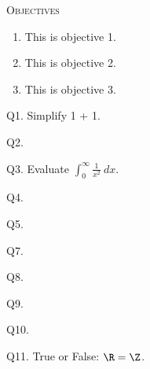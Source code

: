 


\renewcommand\COURSENAME{System Penetration and Hacking}
\renewcommand\COURSESHORTNAME{System Penetration \& Hacking}
\renewcommand\COURSENUMBER{CISS999}
\renewcommand\TITLE{Assignment 42}


\topmatter

\textsc{Objectives}
\begin{enumerate}[nosep]
\item This is objective 1.
\item This is objective 2.
\item This is objective 3.
\end{enumerate}




\newpage
Q1. Simplify 1 + 1.




\newpage
Q2. \lipsum[1-2]




\newpage
Q3. Evaluate $\int_0^\infty \frac{1}{x^2} \ dx$.




\newpage
Q4. \lipsum[3-5]




\newpage
Q5. \lipsum[6]




\newpage
Q7. \lipsum[7-8]




\newpage
Q8. \lipsum[9]




\newpage
Q9. \lipsum[10-11]




\newpage
Q10. \lipsum[10-12]




\newpage
Q11. True or False: $\R = \Z$.


